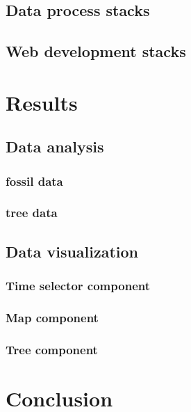 \documentclass[11pt, a4paper,oneside,chapterprefix=false]{scrbook}
\begin{document}
\section{Data process stacks}\label{sec:implementation_data_processing}
\section{Web development stacks}\label{sec:implementation_web_development}

\chapter{Results} \label{chp:results}
\section{Data analysis} \label{sec:result_data_analysis}
\subsection{fossil data} \label{subsec:data_analysis_fossil}
\subsection{tree data} \label{subsec:data_analysis_tree}

\section{Data visualization} \label{sec:result_data_visualization}
\subsection{Time selector component} \label{subsec:data_visualization_time}
\subsection{Map component} \label{subsec:data_visualization_map}
\subsection{Tree component} \label{subsec:data_visualization_component}
\chapter{Conclusion} \label{chp:discussion_conclusion}
\end{document}
